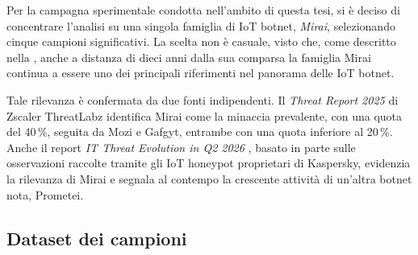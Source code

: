Per la campagna sperimentale condotta nell'ambito di questa tesi, si è deciso di concentrare l'analisi su una singola famiglia di IoT botnet, \emph{Mirai}, selezionando cinque campioni significativi. La scelta non è casuale, visto che, come descritto nella , anche a distanza di dieci anni dalla sua comparsa la famiglia Mirai continua a essere uno dei principali riferimenti nel panorama delle IoT botnet.



Tale rilevanza è confermata da due fonti indipendenti. Il \emph{Threat Report 2025} di Zscaler ThreatLabz \cite{zscaler2025threatiot} identifica Mirai come la minaccia prevalente, con una quota del 40\,\%, seguita da Mozi e Gafgyt, entrambe con una quota inferiore al 20\,\%. Anche il report \emph{IT Threat Evolution in Q2 2026} \cite{kaspersky2026itthreat}, basato in parte sulle osservazioni raccolte tramite gli IoT honeypot proprietari di Kaspersky, evidenzia la rilevanza di Mirai e segnala al contempo la crescente attività di un'altra botnet nota, Prometei.



\subsection{Dataset dei campioni} %

